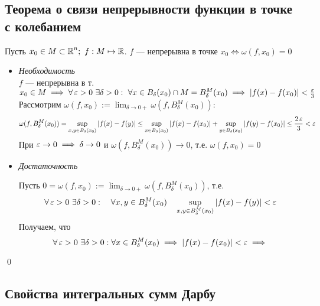 \documentclass[a4paper]{article}
\begin{document}
\subsection{Теорема о связи непрерывности функции в точке с колебанием}
\theorem Пусть $x_0 \in M \subset \operatorname{\mathbb{R}}^n; \,\, f: M\mapsto\operatorname{\mathbb{R}}$. $f$ — непрерывна в точке $x_0 \iff \omega(f, x_0) = 0$

\proof
\begin{itemize}
    \item \textit{Необходимость}\\
        
        $f$ — непрерывна в т. $x_0 \in M \implies \forall \operatorname{\varepsilon} > 0 \,\, \exists\delta > 0:\,\, \forall x \in B_{\delta}(x_0)\cap M = B_{\delta}^M(x_0) \implies |f(x) - f(x_0)| < \frac{\operatorname{\varepsilon}}{3}$\\
        Рассмотрим $\omega(f, x_0) := \displaystyle\lim_{\delta\to0+} \omega(f, B_{\delta}^M(x_0))$:
        \begin{equation*}
            \begin{aligned}
                \omega(f, B_{\delta}^M(x_0)) = \sup_{x, y \in B_{\delta}(x_0)}|f(x) - f(y)| \le \sup_{x\in B_{\delta}(x_0)} |f(x) - f(x_0)| + \sup_{y\in B_{\delta}(x_0)} |f(y) - f(x_0)| \le \frac{2\operatorname{\varepsilon}}{3} < \operatorname{\varepsilon}
            \end{aligned}
        \end{equation*}
        При $\operatorname{\varepsilon}\to0 \implies \delta\to0$ и $\omega(f, B_{\delta}^M(x_0))\to0$, т.е. $\omega(f, x_0) = 0$

    \item \textit{Достаточность}

        Пусть $0 = \omega(f, x_0) := \displaystyle\lim_{\delta\to0+} \omega(f, B_{\delta}^M(x_0))$, т.е.
        \begin{equation*}
            \forall \operatorname{\varepsilon} > 0 \,\, \exists\delta > 0: \quad \forall x, y \in B_{\delta}^M(x_0) \quad \sup_{x, y\in B_{\delta}^M(x_0)} |f(x)-f(y)| < \operatorname{\varepsilon}
        \end{equation*}
        Получаем, что
        \begin{equation*}
            \forall \operatorname{\varepsilon} > 0 \,\, \exists \delta > 0: \forall x \in B_{\delta}^M(x_0) \implies |f(x)-f(x_0)| < \operatorname{\varepsilon} \implies
        \end{equation*}
\end{itemize}\qed

\subsection{Свойства интегральных сумм Дарбу}
\end{document}
